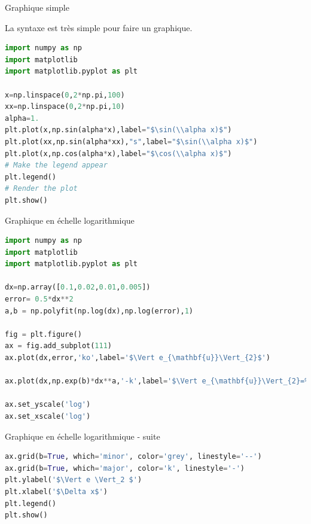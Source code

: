 \documentclass[]{beamer}
\begin{document}
\begin{frame}[fragile]{Graphique simple}

La syntaxe est très simple pour faire un graphique.

\begin{lstlisting}[language=Python]
import numpy as np
import matplotlib
import matplotlib.pyplot as plt

x=np.linspace(0,2*np.pi,100)
xx=np.linspace(0,2*np.pi,10)
alpha=1.
plt.plot(x,np.sin(alpha*x),label="$\sin(\\alpha x)$")
plt.plot(xx,np.sin(alpha*xx),"s",label="$\sin(\\alpha x)$")
plt.plot(x,np.cos(alpha*x),label="$\cos(\\alpha x)$")
# Make the legend appear
plt.legend()
# Render the plot
plt.show()
\end{lstlisting}

\end{frame}


\begin{frame}[fragile]{Graphique en échelle logarithmique}

\begin{lstlisting}[language=Python]
import numpy as np
import matplotlib
import matplotlib.pyplot as plt

dx=np.array([0.1,0.02,0.01,0.005])
error= 0.5*dx**2
a,b = np.polyfit(np.log(dx),np.log(error),1)

fig = plt.figure()
ax = fig.add_subplot(111) 
ax.plot(dx,error,'ko',label='$\Vert e_{\mathbf{u}}\Vert_{2}$')

ax.plot(dx,np.exp(b)*dx**a,'-k',label='$\Vert e_{\mathbf{u}}\Vert_{2}=%3.2f  \Delta x^{%3.2f}$' %(np.exp(b),a))

ax.set_yscale('log')
ax.set_xscale('log')

\end{lstlisting}
\end{frame}

\begin{frame}[fragile]{Graphique en échelle logarithmique - suite }

\begin{lstlisting}[language=Python]
ax.grid(b=True, which='minor', color='grey', linestyle='--')
ax.grid(b=True, which='major', color='k', linestyle='-')
plt.ylabel('$\Vert e \Vert_2 $')
plt.xlabel('$\Delta x$')
plt.legend()
plt.show()
\end{lstlisting}

\end{frame}
\end{document}
